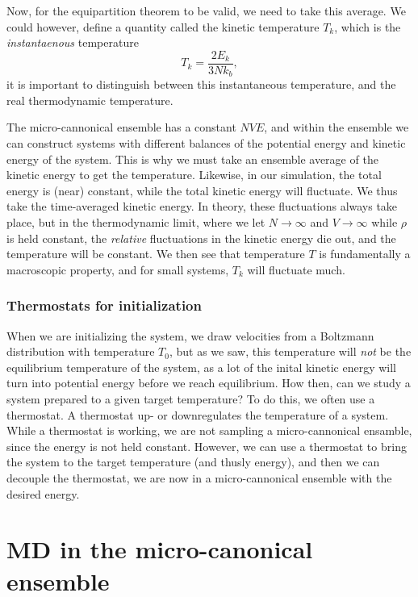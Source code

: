 \documentclass[a4paper, 11pt, notitlepage, english]{article}
\begin{document}
Now, for the equipartition theorem to be valid, we need to take this average. We could however, define a quantity called the kinetic temperature $T_k$, which is the \emph{instantaenous} temperature
$$T_k = \frac{2 E_k}{3Nk_b},$$
it is important to distinguish between this instantaneous temperature, and the real thermodynamic temperature.

The micro-cannonical ensemble has a constant $NVE$, and within the ensemble we can construct systems with different balances of the potential energy and kinetic energy of the system. This is why we must take an ensemble average of the kinetic energy to get the temperature. Likewise, in our simulation, the total energy is (near) constant, while the total kinetic energy will fluctuate. We thus take the time-averaged kinetic energy. In theory, these fluctuations always take place, but in the thermodynamic limit, where we let $N\to \infty$ and $V\to \infty$ while $\rho$ is held constant, the \emph{relative} fluctuations in the kinetic energy die out, and the temperature will be constant. We then see that temperature $T$ is fundamentally a macroscopic property, and for small systems, $T_k$ will fluctuate much.

\subsubsection*{Thermostats for initialization}

When we are initializing the system, we draw velocities from a Boltzmann distribution with temperature $T_0$, but as we saw, this temperature will \emph{not} be the equilibrium temperature of the system, as a lot of the inital kinetic energy will turn into potential energy before we reach equilibrium. How then, can we study a system prepared to a given target temperature? To do this, we often use a thermostat. A thermostat up- or downregulates the temperature of a system. While a thermostat is working, we are not sampling a micro-cannonical ensamble, since the energy is not held constant. However, we can use a thermostat to bring the system to the target temperature (and thusly energy), and then we can decouple the thermostat, we are now in a micro-cannonical ensemble with the desired energy. 

\clearpage


\section{MD in the micro-canonical ensemble}
\end{document}
